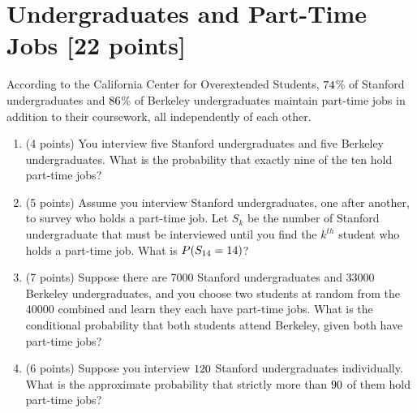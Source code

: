 \newpage
\section{Undergraduates and Part-Time Jobs [22 points]}\label{sec:jobs}
According to the California Center for Overextended Students, $74{}$\% of Stanford undergraduates and $86{}$\% of Berkeley undergraduates maintain part-time jobs in addition to their coursework, all independently of each other.

\begin{enumerate}[label=\alph*.]

\item (4 points) You interview five Stanford undergraduates and five Berkeley undergraduates.  What is the probability that exactly nine of the ten hold part-time jobs?
	
		
		

\item (5 points) Assume you interview Stanford undergraduates, one after another, to survey who holds a part-time job. Let $S_k$ be the number of Stanford undergraduate that must be interviewed until you find the $k^{th}$ student who holds a part-time job.  What is $P(S_{14{}} = 14{})$? 
	

\item (7 points) Suppose there are 7000 Stanford undergraduates and 33000 Berkeley undergraduates, and you choose two students at random from the 40000 combined and learn they each have part-time jobs. What is the conditional probability that both students attend Berkeley, given both have part-time jobs?
	


\item (6 points) Suppose you interview $120{}$ Stanford undergraduates individually.  What is the approximate probability that strictly more than $90{}$ of them hold part-time jobs?
	

\end{enumerate}
